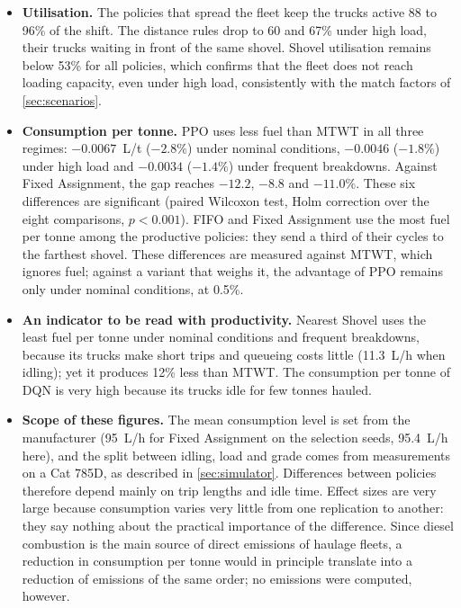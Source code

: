 \documentclass[11pt,a4paper]{article}
\newif\ifrevmarks
\newcommand{\revtag}[1]{\ifrevmarks\textsuperscript{\textcolor{red!70!black}{\scriptsize[#1]}}\fi}
\newenvironment{revbloc}[1]{\par\ifrevmarks\color{revcolor}\noindent\revtag{#1}\ \fi}{\par}
\newif\ifcorrmarks
\newcommand{\corr}[1]{\ifcorrmarks\textcolor{corrcolor}{#1}\else#1\fi}
\begin{document}
\begin{revbloc}{T31}
\begin{itemize}
  \item \textbf{Utilisation.} The policies that spread the fleet keep the trucks active 88 to 96\% of the shift. The distance rules drop to 60 and 67\% under high load, their trucks waiting in front of the same shovel. Shovel utilisation remains below 53\% for all policies, which confirms that the fleet does not reach loading capacity, even under high load, consistently with the match factors of \cref{sec:scenarios}.
  \item \textbf{Consumption per tonne.} PPO uses less fuel than MTWT in all three regimes: $-0.0067$~L/t ($-2.8\%$) under nominal conditions, $-0.0046$ ($-1.8\%$) under high load and $-0.0034$ ($-1.4\%$) under frequent breakdowns. Against Fixed Assignment, the gap reaches $-12.2$, $-8.8$ and $-11.0\%$. These six differences are significant (paired Wilcoxon test, Holm correction over the eight comparisons, $p<0.001$). FIFO and Fixed Assignment use the most fuel per tonne among the productive policies: they send a third of their cycles to the farthest shovel. \corr{These differences are measured against MTWT, which ignores fuel; against a variant that weighs it, the advantage of PPO remains only under nominal conditions, at 0.5\%.}
  \item \textbf{An indicator to be read with productivity.} Nearest Shovel uses the least fuel per tonne under nominal conditions and frequent breakdowns, because its trucks make short trips and queueing costs little (11.3~L/h when idling); yet it produces 12\% less than MTWT. The consumption per tonne of DQN is very high because its trucks idle for few tonnes hauled.
  \item \textbf{Scope of these figures.} The mean consumption level is set from the manufacturer (95~L/h for Fixed Assignment on the selection seeds, 95.4~L/h here), and the split between idling, load and grade comes from measurements on a Cat 785D, as described in \cref{sec:simulator}. Differences between policies therefore depend mainly on trip lengths and idle time. Effect sizes are very large because consumption varies very little from one replication to another: they say nothing about the practical importance of the difference. Since diesel combustion is the main source of direct emissions of haulage fleets, a reduction in consumption per tonne would in principle translate into a reduction of emissions of the same order; no emissions were computed, however.
\end{itemize}
\end{revbloc}
\end{document}
